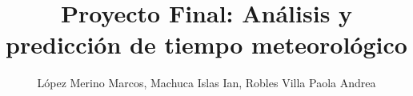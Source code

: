 \documentclass[twoside, digital, 12pt]{fc-hw-template}
\title{Proyecto Final: Análisis y predicción de tiempo meteorológico}
\author{López Merino Marcos, Machuca Islas Ian, Robles Villa Paola Andrea}
\begin{document}
    \maketitle

    
    
    

    

    \nocite{*}
    \printbibliography
\end{document}
